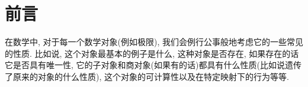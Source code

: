 \chapter*{前言}

在数学中, 对于每一个数学对象(例如极限), 我们会例行公事般地考虑它的一些常见的性质. 比如说, 这个对象最基本的例子是什么, 这种对象是否存在, 如果存在的话它是否具有唯一性, 它的子对象和商对象(如果有的话)都具有什么性质(比如说遗传了原来的对象的什么性质), 这个对象的可计算性以及在特定映射下的行为等等.